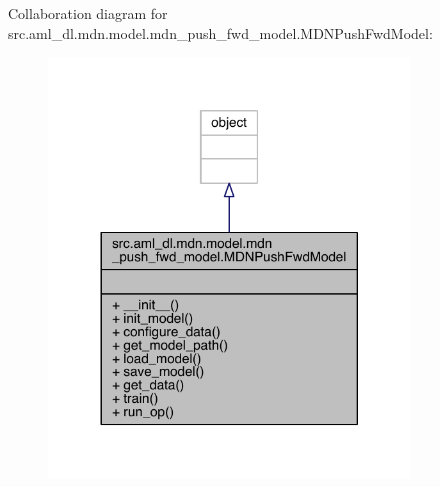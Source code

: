 Collaboration diagram for src.\+aml\+\_\+dl.\+mdn.\+model.\+mdn\+\_\+push\+\_\+fwd\+\_\+model.\+M\+D\+N\+Push\+Fwd\+Model\+:
\nopagebreak
\begin{figure}[H]
\begin{center}
\leavevmode
\includegraphics[width=272pt]{classsrc_1_1aml__dl_1_1mdn_1_1model_1_1mdn__push__fwd__model_1_1_m_d_n_push_fwd_model__coll__graph}
\end{center}
\end{figure}

